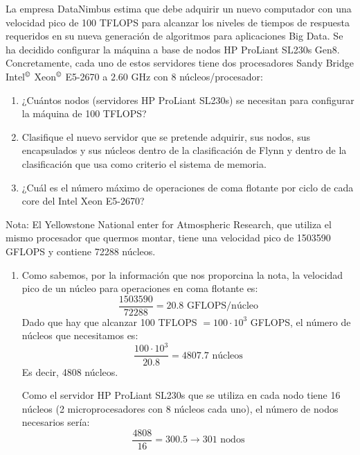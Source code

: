 \begin{ejercicio}
    La empresa DataNimbus estima que debe adquirir un nuevo computador con una velocidad pico de 100 TFLOPS para alcanzar los niveles de tiempos de respuesta requeridos en su nueva generación de algoritmos para aplicaciones Big Data. Se ha decidido configurar la máquina a base de nodos HP ProLiant SL230s Gen8. Concretamente, cada uno de estos servidores tiene dos procesadores Sandy Bridge Intel$^\copyright$ Xeon$^\copyright$ E5-2670 a $2.60$ GHz con 8 núcleos/procesador: 
    \begin{enumerate}
        \item ¿Cuántos nodos (servidores HP ProLiant SL230s) se necesitan para configurar la máquina de 100 TFLOPS?
        \item Clasifique el nuevo servidor que se pretende adquirir, sus nodos, sus encapsulados y sus núcleos dentro de la clasificación de Flynn y dentro de la clasificación que usa como criterio el sistema de memoria.
        \item ¿Cuál es el número máximo de operaciones de coma flotante por ciclo de cada core del Intel Xeon E5-2670?
    \end{enumerate}
    Nota: El Yellowstone National enter for Atmospheric Research, que utiliza el mismo procesador que quermos montar, tiene una velocidad pico de 1503590 GFLOPS y contiene 72288 núcleos.

    \begin{enumerate}
        \item Como sabemos, por la información que nos proporcina la nota, la velocidad pico de un núcleo para operaciones en coma flotante es:
            \begin{equation*}
                \dfrac{1503590}{72288} = 20.8 \text{\ GFLOPS/núcleo}
            \end{equation*}
            Dado que hay que alcanzar 100 TFLOPS $= 100\cdot 10^3$ GFLOPS, el número de núcleos que necesitamos es:
            \begin{equation*}
                \dfrac{100\cdot 10^3}{20.8} = 4807.7 \text{\ núcleos}
            \end{equation*}
            Es decir, 4808 núcleos.

            Como el servidor HP ProLiant SL230s que se utiliza en cada nodo tiene 16 núcleos (2 microprocesadores con 8 núcleos cada uno), el número de nodos necesarios sería:
            \begin{equation*}
                \dfrac{4808}{16} = 300.5 \longrightarrow 301 \text{\ nodos}
            \end{equation*}


\end{enumerate}
\end{ejercicio}
